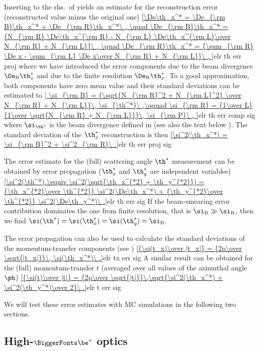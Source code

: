 Inserting  to the rhs.~of  yields an estimate for the reconstruction error (reconstructed value minus the original one)
\eqref{\De\th_x^* = \De_{\rm B}\th_x^* + \De_{\rm R}\th_x^*\ ,
	\quad \De_{\rm B}\th_x^* = {N_{\rm R} \De\th_x^{\rm R} - N_{\rm L} \De\th_x^{\rm L}\over N_{\rm R} + N_{\rm L}}\ ,
	\quad \De_{\rm R}\th_x^* = {\sum_{\rm R} \De x - \sum_{\rm L} \De x\over  N_{\rm R} + N_{\rm L}}\ ,
}{elr th err proj}
where we have introduced the error components due to the beam divergence $\De_{\rm B}\th_x^*$ and due to the finite resolution $\De_{\rm R}\th_x^*$. To a good approximation, both components have zero mean value and their standard deviations can be estimated to
\eqref{
	\si_{\rm B} = {\sqrt{N_{\rm R}^2 + N_{\rm L}^2} \over N_{\rm R} + N_{\rm L}}\, \si_{\th^*}\ ,\qquad
	\si_{\rm R} = {1\over L} {1\over \sqrt{N_{\rm R} + N_{\rm L}}}\, \si_{\rm P}\ ,
}{elr th err comp sig}
where $\si_{\th^*}$ is the beam divergence defined in  (see also the text below ). The standard deviation of the $\th_x^*$ reconstruction is then
\eqref{\si^2(\th_x^*) = \si_{\rm B}^2 + \si^2_{\rm R}\ .}{elr th err proj sig}

The error estimate for the (full) scattering angle $\th^*$ measurement can be obtained by error propagation ($\th_x^*$ and $\th_y^*$ are independent variables)
\eqref{\si^2(\th^*) \equiv \si^2(\sqrt{\th_x^{*2} + \th_y^{*2}}) = {\th_x^{*2}\over \th^{*2}} \si^2(\De\th_x^*) + {\th_y^{*2}\over \th^{*2}} \si^2(\De\th_y^*)\ .}{elr th err sig}
If the beam-smearing error contribution dominates the one from finite resolution, that is $\si_{\rm B} \gg \si_{\rm R}$, then we find $\si(\th^*) = \si(\th_x^*) = \si(\th_y^*) = \si_{\rm B}$.

The error propagation can also be used to calculate the standard deviations of the momentum-transfer components (see )
\eqref{{\si(t_x)\over |t_x|} = {2p\over \sqrt{|t_x|}}\, \si(\th_x^*)\ .}{elr tx err sig}
A similar result can be obtained for the (full) momentum-transfer $t$ (averaged over all values of the azimuthal angle $\ph$)
\eqref{{\si(t)\over |t|} = {2p\over \sqrt{|t|}}\,\sqrt{\si^2(\th_x^*) + \si^2(\th_y^*)\over 2}\ .}{elr t err sig}

We will test these error estimates with MC simulations in the following two sections.


\def\OutlineLabel{High-beta* optics}
\def\TOCLabel{High-$\be^*$ optics}
\subsection[elr 1535]{High-$\BiggerFonts\mathbf\be^*$ optics}


